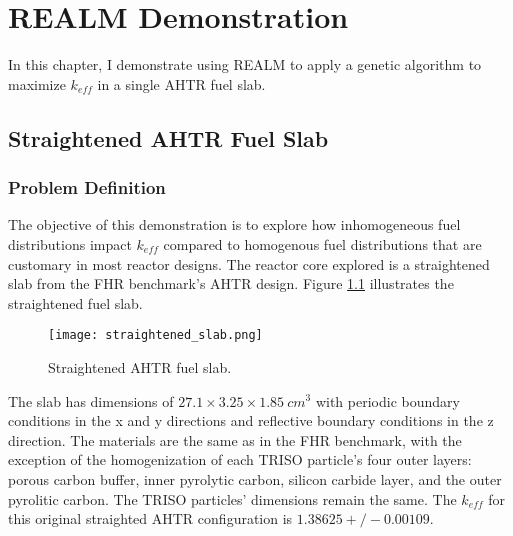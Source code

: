 \chapter{REALM Demonstration}
In this chapter, I demonstrate using \gls{REALM} to apply a genetic algorithm 
to maximize $k_{eff}$ in a single \gls{AHTR} fuel slab.  

\section{Straightened AHTR Fuel Slab}
\subsection{Problem Definition}
The objective of this demonstration is to explore how inhomogeneous fuel 
distributions impact $k_{eff}$ compared to homogenous fuel distributions that 
are customary in most reactor designs. 
The reactor core explored is a straightened slab from the \gls{FHR} benchmark's
\gls{AHTR} design.
Figure \ref{fig:straightened_slab} illustrates the straightened fuel slab. 
\begin{figure}[]
    \centering
    \texttt{[image: straightened\_slab.png]}
    \raggedright
    \caption{Straightened \acrfull{AHTR} fuel slab.}
    \label{fig:straightened_slab}
\end{figure}
The slab has dimensions of $27.1 \times 3.25 \times 1.85\ cm^3$
with periodic boundary conditions in the x and y directions and reflective 
boundary conditions in the z direction. 
The materials are the same as in the \gls{FHR} benchmark, with the exception 
of the homogenization of each \gls{TRISO} particle's four outer layers: 
porous carbon buffer, inner pyrolytic carbon, silicon carbide layer, and the 
outer pyrolitic carbon. 
The \gls{TRISO} particles' dimensions remain the same.
The $k_{eff}$ for this original straighted \gls{AHTR} configuration is 
$1.38625 +/- 0.00109$. 

